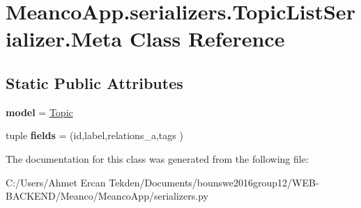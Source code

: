 \hypertarget{class_meanco_app_1_1serializers_1_1_topic_list_serializer_1_1_meta}{}\section{Meanco\+App.\+serializers.\+Topic\+List\+Serializer.\+Meta Class Reference}
\label{class_meanco_app_1_1serializers_1_1_topic_list_serializer_1_1_meta}
\subsection*{Static Public Attributes}
\begin{DoxyCompactItemize}
\item 
\hypertarget{class_meanco_app_1_1serializers_1_1_topic_list_serializer_1_1_meta_a658964e3e5bdfacd4eec435bef86f268}{}\label{class_meanco_app_1_1serializers_1_1_topic_list_serializer_1_1_meta_a658964e3e5bdfacd4eec435bef86f268} 
{\bfseries model} = \hyperlink{class_meanco_app_1_1models_1_1topic_1_1_topic}{Topic}
\item 
\hypertarget{class_meanco_app_1_1serializers_1_1_topic_list_serializer_1_1_meta_a9d64e5ace31b32103a2c944c58fb8f19}{}\label{class_meanco_app_1_1serializers_1_1_topic_list_serializer_1_1_meta_a9d64e5ace31b32103a2c944c58fb8f19} 
tuple {\bfseries fields} = (\textquotesingle{}id\textquotesingle{},\textquotesingle{}label\textquotesingle{},\textquotesingle{}relations\+\_\+a\textquotesingle{},\textquotesingle{}tags\textquotesingle{} )
\end{DoxyCompactItemize}


The documentation for this class was generated from the following file\+:\begin{DoxyCompactItemize}
\item 
C\+:/\+Users/\+Ahmet Ercan Tekden/\+Documents/bounswe2016group12/\+W\+E\+B-\/\+B\+A\+C\+K\+E\+N\+D/\+Meanco/\+Meanco\+App/serializers.\+py\end{DoxyCompactItemize}
